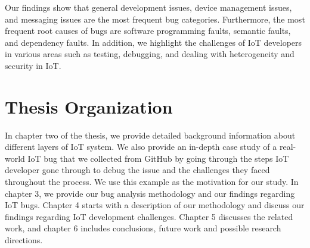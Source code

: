 Our findings show that general development issues, device management issues, and messaging issues are the most frequent bug categories. Furthermore, the most frequent root causes of bugs are software programming faults, semantic faults, and dependency faults. In addition, we highlight the challenges of IoT developers in various areas such as testing, debugging, and dealing with heterogeneity and security in IoT. 

\section{Thesis Organization }
In chapter two of the thesis, we provide detailed background information about different layers of IoT system. We also provide an in-depth case study of a real-world IoT bug that we collected from GitHub by going through the steps IoT developer gone through to debug the issue and the challenges they faced throughout the process. We use this example as the motivation for our study. In chapter 3, we provide our bug analysis methodology and our findings regarding IoT bugs. Chapter 4 starts with a description of our methodology and discuss our findings regarding IoT development challenges. Chapter 5 discusses the related work, and chapter 6 includes conclusions, future work and possible research directions.

\endinput


